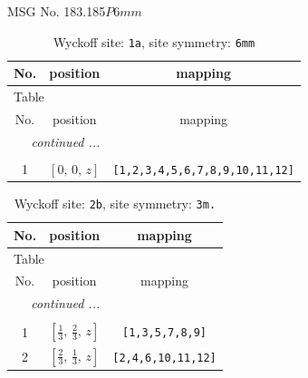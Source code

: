 \documentclass[fleqn,8pt]{jsarticle}
\begin{document}
\setcounter{MaxMatrixCols}{32}

\renewcommand{\tablename}{Table~}
\renewcommand{\figurename}{Figure~}
\begin{center}
\LARGE
MSG No. 183.185\quad$P6mm$
\end{center}
\renewcommand{\arraystretch}{1.2}
\begin{longtable}{ccc}
\caption{Wyckoff site: {\tt 1a}, site symmetry: {\tt 6mm}}
 \\
 \hline \hline
No. & position & mapping \\ \hline \endfirsthead

\multicolumn{2}{l}{\tablename\ \thetable{}} \\
 \hline \hline
No. & position & mapping \\ \hline \endhead

 \hline \hline
\multicolumn{2}{r}{\footnotesize\it continued ...} \\ \endfoot

 \hline \hline
\multicolumn{2}{r}{} \\ \endlastfoot

1 & $\left[ 0,\, 0,\, z \right]$ & {\tt [1,2,3,4,5,6,7,8,9,10,11,12]} \\
\end{longtable}
\renewcommand{\arraystretch}{1.2}
\begin{longtable}{ccc}
\caption{Wyckoff site: {\tt 2b}, site symmetry: {\tt 3m.}}
 \\
 \hline \hline
No. & position & mapping \\ \hline \endfirsthead

\multicolumn{2}{l}{\tablename\ \thetable{}} \\
 \hline \hline
No. & position & mapping \\ \hline \endhead

 \hline \hline
\multicolumn{2}{r}{\footnotesize\it continued ...} \\ \endfoot

 \hline \hline
\multicolumn{2}{r}{} \\ \endlastfoot

1 & $\left[ \frac{1}{3},\, \frac{2}{3},\, z \right]$ & {\tt [1,3,5,7,8,9]} \\ \hline
2 & $\left[ \frac{2}{3},\, \frac{1}{3},\, z \right]$ & {\tt [2,4,6,10,11,12]} \\
\end{longtable}
\renewcommand{\arraystretch}{1.2}
\end{document}
